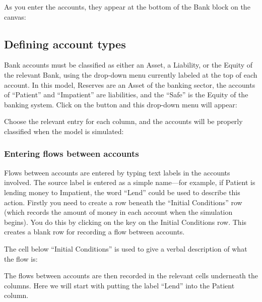 
As you enter the accounts, they appear at the bottom of the Bank block on the canvas:


\subsection{Defining account types}

Bank accounts must be classified as either an Asset, a Liability, or
the Equity of the relevant Bank, using the drop-down menu currently
labeled  at the top of each account. In
this model, Reserves are an Asset of the banking sector, the accounts
of ``Patient'' and ``Impatient'' are liabilities, and the ``Safe'' is
the Equity of the banking system. Click on the
 button and this drop-down menu will
appear:


Choose the relevant entry for each column, and the accounts will be properly classified when the model is simulated:


\subsubsection{Entering flows between accounts}


Flows between accounts are entered by typing text labels in the
accounts involved. The source label is entered as a simple name---for
example, if Patient is lending money to Impatient, the word ``Lend''
could be used to describe this action. Firstly you need to create a
row beneath the ``Initial Conditions'' row (which records the amount of
money in each account when the simulation begins). You do this by
clicking on the  key on the Initial Conditions row. This creates a
blank row for recording a flow between accounts.


The cell below ``Initial Conditions'' is used to give a verbal
description of what the flow is: 


The flows between accounts are then recorded in the relevant cells
underneath the columns. Here we will start with putting the label
``Lend'' into the Patient column. 

